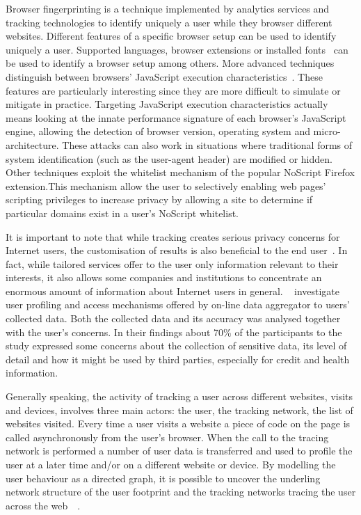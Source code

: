 Browser fingerprinting is a technique implemented by analytics services and tracking technologies to identify uniquely a user while they browser different websites. Different features of a specific browser setup can be used to identify uniquely a user. Supported languages, browser extensions or installed fonts~\cite{boda2012user} can be used to identify a browser setup among others. More advanced techniques distinguish between browsers' JavaScript execution characteristics~\cite{mowery2011fingerprinting}. These features are particularly interesting since they are more difficult to simulate or mitigate in practice. Targeting JavaScript execution characteristics actually means looking at the innate performance signature of each browser's JavaScript engine, allowing the detection of browser version, operating system and micro-architecture. These attacks can also work in situations where traditional forms of system identification (such as the user-agent header) are modified or hidden. Other techniques exploit the whitelist mechanism of the popular NoScript Firefox extension.This mechanism allow the user to selectively enabling web pages' scripting privileges to increase privacy by allowing a site to determine if particular domains exist in a user's NoScript whitelist.

It is important to note that while tracking creates serious privacy concerns for Internet users, the customisation of results is also beneficial to the end user~\cite{castelluccia2012behavioural}. In fact, while tailored services offer to the user only information relevant to their interests, it also allows some companies and institutions to concentrate an enormous amount of information about Internet users in general. ~\cite{rao2015they} investigate user profiling and access mechanisms offered by on-line data aggregator to users' collected data. Both the collected data and its accuracy was analysed together with the user's concerns. In their findings about 70\% of the participants to the study expressed some concerns about the collection of sensitive data, its level of detail and how it might be used by third parties, especially for credit and health information.

Generally speaking, the activity of tracking a user across different websites, visits and devices, involves three main actors: the user, the tracking network, the list of websites visited. Every time a user visits a website a piece of code on the page is called asynchronously from the user's browser. When the call to the tracing network is performed a number of user data is transferred and used to profile the user at a later time and/or on a different website or device.  By modelling the user behaviour as a directed graph, it is possible to uncover the underling network structure of the user footprint and the tracking networks tracing the user across the web~\cite{kalavri2016like}~\cite{schelter2016tracking}.

